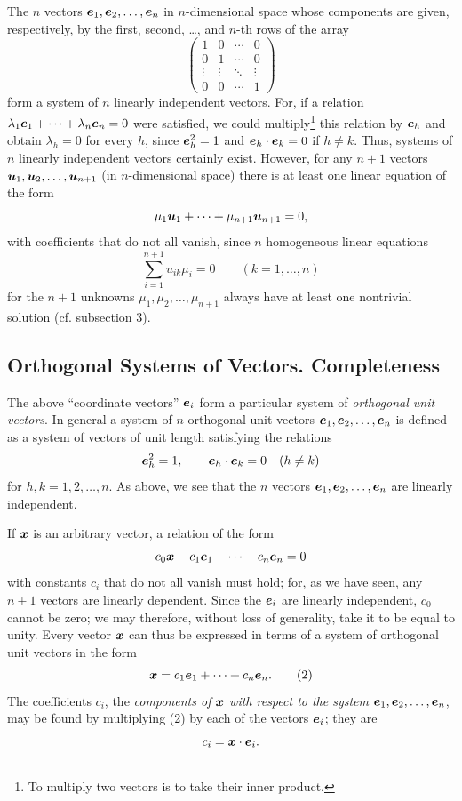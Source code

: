 The $n$ vectors $\bm{e}_1,\bm{e}_2,\ldots,\bm{e}_n$ in $n$-dimensional space whose components are given, respectively, by the first, second, \ldots, and $n$-th rows of the array
\[
\begin{pmatrix}
1&0&\cdots&0\\
0&1&\cdots&0\\
\vdots&\vdots&\ddots&\vdots\\
0&0&\cdots&1
\end{pmatrix}
\]
form a system of $n$ linearly independent vectors. For, if a relation $\lambda_1\bm{e}_1+\cdots+\lambda_n\bm{e}_n=0$ were satisfied, we could multiply\footnote{To multiply two vectors is to take their inner product.} this relation by $\bm{e}_h$ and obtain $\lambda_h=0$ for every $h$, since $\bm{e}_h^2=1$ and $\bm{e}_h\cdot\bm{e}_k=0$ if $h\ne k$. Thus, systems of $n$ linearly independent vectors certainly exist. However, for any $n+1$ vectors $\bm{u}_1,\bm{u}_2,\ldots,\bm{u}_{n+1}$ (in $n$-dimensional space) there is at least one linear equation of the form
\[
\mu_1\bm{u}_1+\cdots+\mu_{n+1}\bm{u}_{n+1}=0,
\]
with coefficients that do not all vanish, since $n$ homogeneous linear equations
\[
\sum_{i=1}^{n+1}u_{ik}\mu_i=0\qquad(k=1,\ldots,n)
\]
for the $n+1$ unknowns $\mu_1,\mu_2,\ldots,\mu_{n+1}$ always have at least one nontrivial solution (cf. subsection 3).

\subsection{Orthogonal Systems of Vectors. Completeness}
The above ``coordinate vectors'' $\bm{e}_i$ form a particular system of \emph{orthogonal unit vectors}. In general a system of $n$ orthogonal unit vectors $\bm{e}_1,\bm{e}_2,\ldots,\bm{e}_n$ is defined as a system of vectors of unit length satisfying the relations
\[
\bm{e}_h^2=1,\qquad \bm{e}_h\cdot\bm{e}_k=0\quad(h\ne k)
\]
for $h,k=1,2,\ldots,n$. As above, we see that the $n$ vectors $\bm{e}_1,\bm{e}_2,\ldots,\bm{e}_n$ are linearly independent.

If $\bm{x}$ is an arbitrary vector, a relation of the form
\[
c_0\bm{x}-c_1\bm{e}_1-\cdots-c_n\bm{e}_n=0
\]
with constants $c_i$ that do not all vanish must hold; for, as we have seen, any $n+1$ vectors are linearly dependent. Since the $\bm{e}_i$ are linearly independent, $c_0$ cannot be zero; we may therefore, without loss of generality, take it to be equal to unity. Every vector $\bm{x}$ can thus be expressed in terms of a system of orthogonal unit vectors in the form
\begin{equation*}
\bm{x}=c_1\bm{e}_1+\cdots+c_n\bm{e}_n.
\tag{2}
\end{equation*}
The coefficients $c_i$, the \emph{components of $\bm{x}$ with respect to the system} $\bm{e}_1,\bm{e}_2,\ldots,\bm{e}_n$, may be found by multiplying (2) by each of the vectors $\bm{e}_i$; they are
\[
c_i=\bm{x}\cdot\bm{e}_i.
\]

